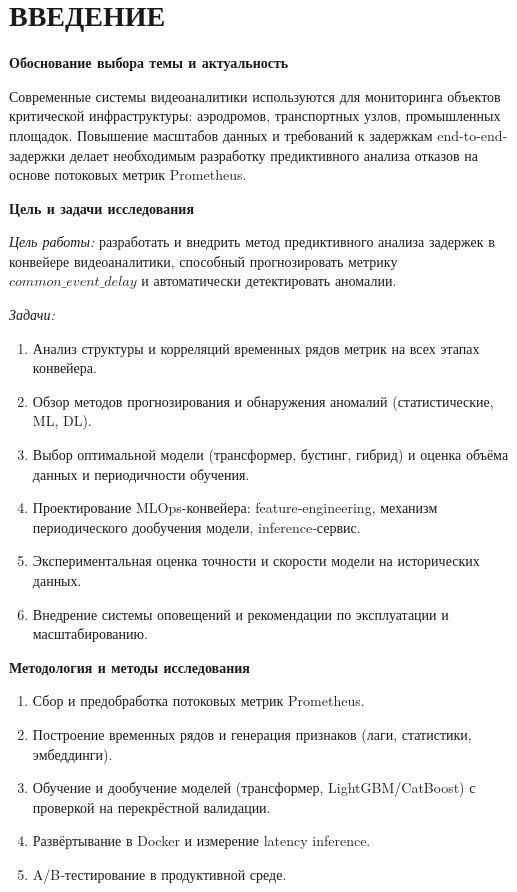 \newpage
\chapter*{ВВЕДЕНИЕ}  


\textbf{Обоснование выбора темы и актуальность}

\hspace*{1.25cm}Современные системы видеоаналитики используются для мониторинга объектов критической инфраструктуры: аэродромов, транспортных узлов, промышленных площадок. Повышение масштабов данных и требований к задержкам end-to-end-задержки делает необходимым разработку предиктивного анализа отказов на основе потоковых метрик Prometheus.

\textbf{Цель и задачи исследования}

\hspace*{1.25cm}\textit{Цель работы:} разработать и внедрить метод предиктивного анализа задержек в конвейере видеоаналитики, способный прогнозировать метрику $common\_event\_delay$ и автоматически детектировать аномалии.

\hspace*{1.25cm}\textit{Задачи:}

\begin{enumerate}
	\item Анализ структуры и корреляций временных рядов метрик на всех этапах конвейера.
	\item Обзор методов прогнозирования и обнаружения аномалий (статистические, ML, DL).
	\item Выбор оптимальной модели (трансформер, бустинг, гибрид) и оценка объёма данных и периодичности обучения.
	\item Проектирование MLOps-конвейера: feature‑engineering, механизм периодического дообучения модели, inference‑сервис.
	\item Экспериментальная оценка точности и скорости модели на исторических данных.
	\item Внедрение системы оповещений и рекомендации по эксплуатации и масштабированию.
\end{enumerate}

\textbf{Методология и методы исследования}

\begin{enumerate}
	\item Сбор и предобработка потоковых метрик Prometheus.
	\item Построение временных рядов и генерация признаков (лаги, статистики, эмбеддинги).
	\item Обучение и дообучение моделей (трансформер, LightGBM/CatBoost) с проверкой на перекрёстной валидации.
	\item Развёртывание в Docker и измерение latency inference.
	\item A/B‑тестирование в продуктивной среде.
\end{enumerate}

